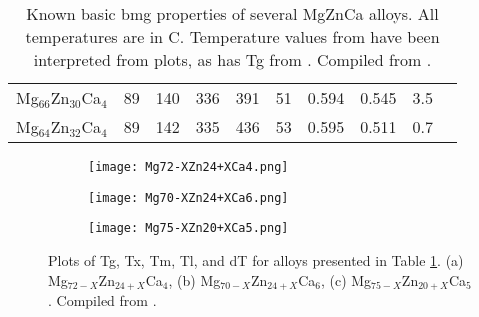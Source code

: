 \documentclass[a4paper,12pt,oneside]{report}%
\begin{document}
\begin{table}[h]
\begin{tabular}{ l l l l l l l l l l }
		Mg$_{66}$Zn$_{30}$Ca$_{4}$ & 89 & 140 & 336 & 391 & 51 & 0.594 & 0.545 & 3.5 & \cite{Cao2013, Cao2012} \\ 
		Mg$_{64}$Zn$_{32}$Ca$_{4}$ & 89 & 142 & 335 & 436 & 53 & 0.595 & 0.511 & 0.7 & \cite{Cao2013, Cao2012} \\
		\bottomrule 
	\end{tabular}
	\caption[Known basic \acrshort{bmg} properties of several MgZnCa alloys. All temperatures are in \degree C.]{Known basic \acrshort{bmg} properties of several MgZnCa alloys. All temperatures are in \degree C. Temperature values from \cite{Gu2005} have been interpreted from plots, as has \acrshort{Tg} from \cite{Wang2013}. Compiled from \cite{Cao2013, Gu2005, Zhou2013, Cao2012, Wang2013}.}
	\label{tab:MgZnCaAlloys}
\end{table}

\begin{figure}[htb]
	\centering
	\begin{subfigure}[htbp]{0.49\textwidth}
		\texttt{[image: Mg72-XZn24+XCa4.png]}
		\caption{}
		\label{fig:Mg72xZn24xCa4}
	\end{subfigure}
	\begin{subfigure}[htbp]{0.49\textwidth}
		\texttt{[image: Mg70-XZn24+XCa6.png]}
		\caption{}
		\label{fig:Mg70xZn24xCa6}
	\end{subfigure}
	\begin{subfigure}[htbp]{0.49\textwidth}
		\texttt{[image: Mg75-XZn20+XCa5.png]}
		\caption{}
		\label{fig:Mg75xZn20xCa5}
	\end{subfigure}
	\caption[Plots of \acrshort{Tg}, \acrshort{Tx}, \acrshort{Tm}, \acrshort{Tl}, and \acrshort{dT} for alloys presented in Table \ref{tab:MgZnCaAlloys}. (a) Mg$_{72-X}$Zn$_{24+X}$Ca$_{4}$, (b) Mg$_{70-X}$Zn$_{24+X}$Ca$_{6}$, (c) Mg$_{75-X}$Zn$_{20+X}$Ca$_{5}$.]{Plots of \acrshort{Tg}, \acrshort{Tx}, \acrshort{Tm}, \acrshort{Tl}, and \acrshort{dT} for alloys presented in Table \ref{tab:MgZnCaAlloys}. (a) Mg$_{72-X}$Zn$_{24+X}$Ca$_{4}$, (b) Mg$_{70-X}$Zn$_{24+X}$Ca$_{6}$, (c) Mg$_{75-X}$Zn$_{20+X}$Ca$_{5}$. Compiled from \cite{Cao2013, Gu2005, Zhou2013, Cao2012, Wang2013}.}%
	\label{fig:MgZnCaPlots}
\end{figure}

\newpage

\printglossaries
\end{document}
